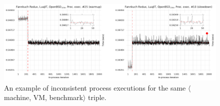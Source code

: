 \documentclass[acmlarge]{acmart}\settopmatter{printfolios=true}
\newcommand{\mvmbtrip}{$\langle$machine, VM, benchmark$\rangle$\xspace}
\begin{document}
\begin{figure}[t!]
\centering
\includegraphics[width=\textwidth]{examples/new_inconsistent.pdf}
\caption{An example of inconsistent process executions for the same \mvmbtrip triple.}
\label{fig:examples:inconsistent}
\vspace{-.4cm}
\end{figure}
\end{document}
